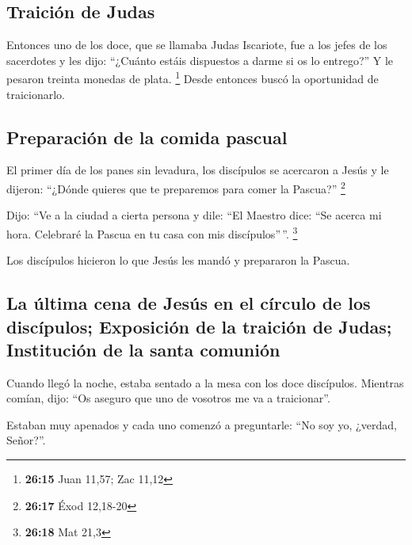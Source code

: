 \begin{paracol}{2}
\hypertarget{traiciuxf3n-de-judas}{%
\subsection{Traición de Judas}\label{traiciuxf3n-de-judas}}

 Entonces uno de los doce, que se llamaba Judas
Iscariote, fue a los jefes de los sacerdotes  y les dijo:
``¿Cuánto estáis dispuestos a darme si os lo entrego?'' Y le pesaron
treinta monedas de plata. \footnote{\textbf{26:15} Juan 11,57; Zac 11,12}
 Desde entonces buscó la oportunidad de traicionarlo.

\hypertarget{preparaciuxf3n-de-la-comida-pascual}{%
\subsection{Preparación de la comida
pascual}\label{preparaciuxf3n-de-la-comida-pascual}}

 El primer día de los panes sin levadura, los discípulos
se acercaron a Jesús y le dijeron: ``¿Dónde quieres que te preparemos
para comer la Pascua?'' \footnote{\textbf{26:17} Éxod 12,18-20}

 Dijo: ``Ve a la ciudad a cierta persona y dile: ``El
Maestro dice: ``Se acerca mi hora. Celebraré la Pascua en tu casa con
mis discípulos''\,''. \footnote{\textbf{26:18} Mat 21,3}

 Los discípulos hicieron lo que Jesús les mandó y
prepararon la Pascua.

\hypertarget{la-uxfaltima-cena-de-jesuxfas-en-el-cuxedrculo-de-los-discuxedpulos-exposiciuxf3n-de-la-traiciuxf3n-de-judas-instituciuxf3n-de-la-santa-comuniuxf3n}{%
\subsection{La última cena de Jesús en el círculo de los discípulos;
Exposición de la traición de Judas; Institución de la santa
comunión}\label{la-uxfaltima-cena-de-jesuxfas-en-el-cuxedrculo-de-los-discuxedpulos-exposiciuxf3n-de-la-traiciuxf3n-de-judas-instituciuxf3n-de-la-santa-comuniuxf3n}}

 Cuando llegó la noche, estaba sentado a la mesa con los
doce discípulos.  Mientras comían, dijo: ``Os aseguro que
uno de vosotros me va a traicionar''.

 Estaban muy apenados y cada uno comenzó a preguntarle:
``No soy yo, ¿verdad, Señor?''.


\end{paracol}
